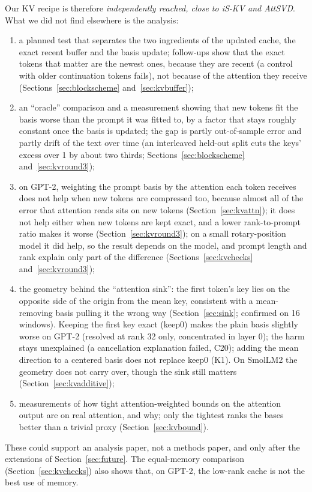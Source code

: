 \documentclass[10pt]{article}
\theoremstyle{plain}
\theoremstyle{definition}
\theoremstyle{remark}
\newcommand{\rl}[1]{\textsf{#1}}%
\begin{document}
Our KV recipe is therefore \emph{independently reached, close to iS-KV and AttSVD}. What we did not find elsewhere is the analysis:
\begin{enumerate}[leftmargin=2em,itemsep=0pt]
\item a planned test that separates the two ingredients of the updated cache, the exact recent buffer and the basis update; follow-ups show that the exact tokens that matter are the newest ones, because they are recent (a control with older continuation tokens fails), not because of the attention they receive (Sections~\ref{sec:blockscheme} and~\ref{sec:kvbuffer});
\item an ``oracle'' comparison and a measurement showing that new tokens fit the basis worse than the prompt it was fitted to, by a factor that stays roughly constant once the basis is updated; the gap is partly out-of-sample error and partly drift of the text over time (an interleaved held-out split cuts the keys' excess over 1 by about two thirds; Sections~\ref{sec:blockscheme} and~\ref{sec:kvround3});
\item on GPT-2, weighting the prompt basis by the attention each token receives does not help when new tokens are compressed too, because almost all of the error that attention reads sits on new tokens (Section~\ref{sec:kvattn}); it does not help either when new tokens are kept exact, and a lower rank-to-prompt ratio makes it worse (Section~\ref{sec:kvround3}); on a small rotary-position model it did help, so the result depends on the model, and prompt length and rank explain only part of the difference (Sections~\ref{sec:kvchecks} and~\ref{sec:kvround3});
\item the geometry behind the ``attention sink'': the first token's key lies on the opposite side of the origin from the mean key, consistent with a mean-removing basis pulling it the wrong way (Section~\ref{sec:sink}; confirmed on 16 windows). Keeping the first key exact (keep0) makes the plain basis slightly worse on GPT-2 (resolved at rank 32 only, concentrated in layer 0); the harm stays unexplained (a cancellation explanation failed, C20); adding the mean direction to a centered basis does not replace keep0 (\rl{K1}). On SmolLM2 the geometry does not carry over, though the sink still matters (Section~\ref{sec:kvadditive});
\item measurements of how tight attention-weighted bounds on the attention output are on real attention, and why; only the tightest ranks the bases better than a trivial proxy (Section~\ref{sec:kvbound}).
\end{enumerate}
These could support an analysis paper, not a methods paper, and only after the extensions of Section~\ref{sec:future}. The equal-memory comparison (Section~\ref{sec:kvchecks}) also shows that, on GPT-2, the low-rank cache is not the best use of memory.
\end{document}
